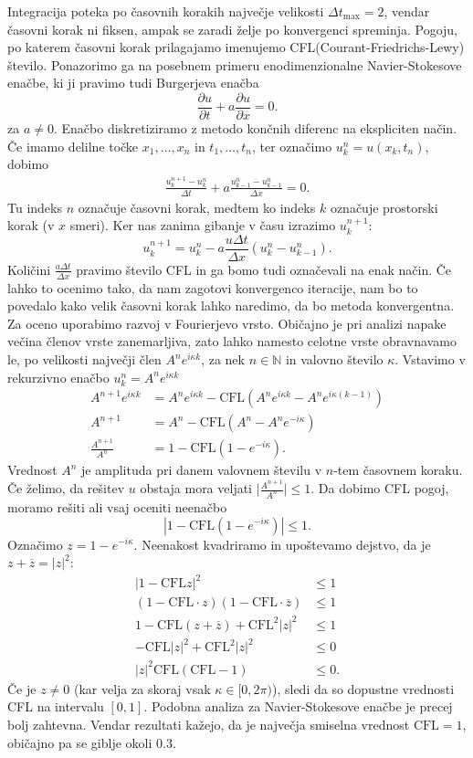 \documentclass[mat2, tisk]{fmfdelo}
\begin{document}
Integracija poteka po časovnih korakih največje velikosti $\Delta t_{\text{max}} = 2$, vendar časovni 
korak ni fiksen, ampak se zaradi želje po konvergenci spreminja. Pogoju, po
katerem časovni korak prilagajamo imenujemo 
CFL(Courant-Friedrichs-Lewy) število. Ponazorimo ga na posebnem 
primeru enodimenzionalne Navier-Stokesove enačbe, ki ji pravimo 
tudi Burgerjeva enačba
$$
\frac{\partial u}{\partial t} + a \frac{\partial u}{\partial x} = 0.
$$
za $a \neq 0$.
Enačbo diskretiziramo z metodo končnih diferenc na ekspliciten način. Če imamo delilne 
točke $x_1, \dots, x_n$ in $t_1, \dots, t_n$, ter označimo $u_k^n = u(x_k, t_n)$, dobimo
\begin{align*}
\frac{u_k^{n+1} - u_k^{n}}{\Delta t} + a\frac{u_{k-1}^{n} - u_{k-1}^{n}}{\Delta x} = 0.
\end{align*}
Tu indeks $n$ označuje časovni korak, medtem ko indeks $k$ označuje prostorski korak (v $x$ smeri).
Ker nas zanima gibanje v času izrazimo $u_k^{n+1}$:
$$
u_k^{n+1} = u_k^{n} - a\frac{u \Delta t}{\Delta x}(u_{k}^{n} - u_{k-1}^{n}).
$$
Količini $\frac{a \Delta t}{\Delta x}$ pravimo število CFL in ga bomo 
tudi označevali na enak način. Če lahko to ocenimo tako, da
nam zagotovi konvergenco iteracije, nam bo to povedalo kako velik 
časovni korak lahko naredimo, da bo metoda konvergentna.
Za oceno uporabimo razvoj v Fourierjevo vrsto. Običajno je pri analizi
napake večina členov vrste zanemarljiva, zato lahko namesto celotne 
vrste obravnavamo le, po velikosti največji člen 
$A^n e^{i\kappa k}$, za nek $n\in \mathbb{N}$ in valovno število 
$\kappa$. Vstavimo v rekurzivno enačbo $u_k^n = A^n e^{i\kappa k}$
\begin{align*}
A^{n+1} e^{i\kappa k} &= A^n e^{i\kappa k} - \text{CFL} (A^n e^{i\kappa k} - A^n e^{i\kappa (k-1)}) \\
A^{n+1} &= A^n - \text{CFL} (A^n - A^n e^{-i\kappa}) \\ 
\frac{A^{n+1}}{A^n} &= 1 - \text{CFL}(1 - e^{-i\kappa}).
\end{align*}
Vrednost $A^n$ je amplituda pri danem valovnem številu v 
$n$-tem časovnem koraku. Če želimo, da rešitev $u$ 
obstaja mora veljati $\Big|\frac{A^{n+1}}{A^n}\Big| \leq 1$. 
Da dobimo CFL pogoj, moramo rešiti ali vsaj oceniti neenačbo 
$$
|1 - \text{CFL}(1 - e^{-i\kappa})| \leq 1. 
$$
Označimo $z = 1 - e^{-i\kappa}$. Neenakost kvadriramo in upoštevamo dejstvo, da je 
$z+\overline{z} = |z|^2$:
\begin{align*}
  |1 - \text{CFL} z|^2 &\leq 1 \\
  (1 - \text{CFL}\cdot z)(1- \text{CFL}\cdot \overline{z}) &\leq 1 \\
  1 - \text{CFL}(z + \overline{z}) + \text{CFL}^2 |z|^2 &\leq 1 \\
  - \text{CFL}|z|^2 + \text{CFL}^2 |z|^2 &\leq 0 \\
  |z|^2 \text{CFL}(\text{CFL} - 1)&\leq 0.
\end{align*}
Če je $z \neq 0$ (kar velja za skoraj vsak $\kappa \in [0, 2\pi)$), sledi da 
so dopustne vrednosti CFL na intervalu $[0, 1]$. Podobna analiza 
za Navier-Stokesove enačbe je precej bolj zahtevna. Vendar rezultati
kažejo, da je največja smiselna vrednost $\text{CFL} = 1$, običajno pa se giblje okoli $0.3$.
\end{document}
